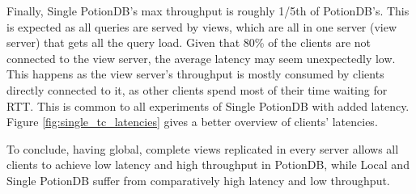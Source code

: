 \documentclass[sigplan,review,anonymous]{acmart}
\begin{document}
Finally, Single PotionDB's max throughput is roughly 1/5th of PotionDB's.
This is expected as all queries are served by views, which are all in one server (view server) that gets all the query load.
Given that 80\% of the clients are not connected to the view server, the average latency may seem unexpectedly low.
This happens as the view server's throughput is mostly consumed by clients directly connected to it, as other clients spend most of their time waiting for RTT.
This is common to all experiments of Single PotionDB with added latency.
Figure \ref{fig:single_tc_latencies} gives a better overview of clients' latencies.

To conclude, having global, complete views replicated in every server allows all clients to achieve low latency and high throughput in PotionDB, while Local and Single PotionDB suffer from comparatively high latency and low throughput.

\end{document}
